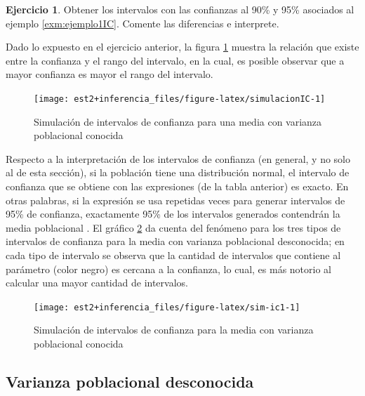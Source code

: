 \documentclass[
  11pt,
]{book}
\theoremstyle{definition}
\theoremstyle{definition}
\theoremstyle{definition}
\newtheorem{exercise}{Ejercicio}[chapter]
\theoremstyle{definition}
\theoremstyle{remark}
\begin{document}
\begin{exercise}
Obtener los intervalos con las confianzas al 90\% y 95\% asociados al ejemplo \ref{exm:ejemplo1IC}. Comente las diferencias e interprete.
\end{exercise}

Dado lo expuesto en el ejercicio anterior, la figura \ref{fig:simulacionIC} muestra la relación que existe entre la confianza y el rango del intervalo, en la cual, es posible observar que a mayor confianza es mayor el rango del intervalo.

\begin{figure}

{\centering \texttt{[image: est2+inferencia\_files/figure-latex/simulacionIC-1]} 

}

\caption{Simulación de intervalos de confianza para una media con varianza poblacional conocida}\label{fig:simulacionIC}
\end{figure}

Respecto a la interpretación de los intervalos de confianza (en general, y no solo al de esta sección), si la población tiene una distribución normal, el intervalo de confianza que se obtiene con las expresiones (de la tabla anterior) es exacto. En otras palabras, si la expresión se usa repetidas veces para generar intervalos de 95\% de confianza, exactamente 95\% de los intervalos generados contendrán la media poblacional \citep[página 257]{Devore}. El gráfico \ref{fig:sim-ic1} da cuenta del fenómeno para los tres tipos de intervalos de confianza para la media con varianza poblacional desconocida; en cada tipo de intervalo se observa que la cantidad de intervalos que contiene al parámetro (color negro) es cercana a la confianza, lo cual, es más notorio al calcular una mayor cantidad de intervalos.

\begin{figure}

{\centering \texttt{[image: est2+inferencia\_files/figure-latex/sim-ic1-1]} 

}

\caption{Simulación de intervalos de confianza para la media con varianza poblacional conocida}\label{fig:sim-ic1}
\end{figure}

\subsection{Varianza poblacional desconocida}\label{intervalo-de-confianza-para-media-varianza-desconocida}
\end{document}

